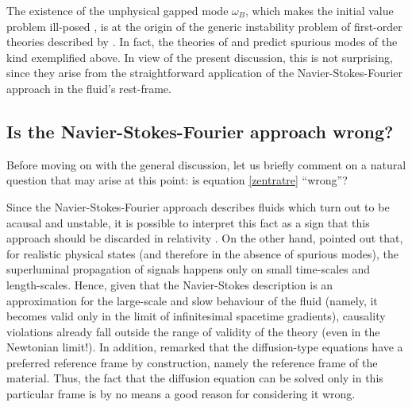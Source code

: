 \documentclass[a4paper, amsfonts, amssymb, amsmath, reprint, twocolumn, showkeys, nofootinbib]{revtex4-2}
\begin{document}
The existence of the unphysical gapped mode $\omega_B$, which makes the initial value problem ill-posed \citep{Kost2000}, is at the origin of the generic instability problem of first-order theories described by \citet{Hiscock_Insatibility_first_order}. In fact, the theories of \citet{Eckart40} and \citet{landau6} predict spurious modes of the kind exemplified above. In view of the present discussion, this is not surprising, since they arise from the straightforward application of the Navier-Stokes-Fourier approach in the fluid's rest-frame. 

\subsection{Is the Navier-Stokes-Fourier approach wrong?}

Before moving on with the general discussion, let us briefly comment on a natural question that may arise at this point: is equation \eqref{zentratre} ``wrong''? 

Since the Navier-Stokes-Fourier approach describes fluids which turn out to be acausal and unstable, it is possible to interpret this fact as a sign that this approach should be discarded in relativity \citep{Hiscock_Insatibility_first_order,rezzolla_book}. 
On the other hand, \citet{Kost2000} pointed out that, for realistic physical states (and therefore in the absence of spurious modes), the superluminal propagation of signals happens only on small time-scales and length-scales. 
Hence, given that the Navier-Stokes description is an approximation for the large-scale and slow behaviour of the fluid (namely, it becomes valid only in the limit of infinitesimal spacetime gradients), causality violations already fall outside the range of validity of the theory (even in the Newtonian limit!). In addition, \citet{Kost2000} remarked that the diffusion-type equations have a preferred reference frame by construction, namely the reference frame of the material. Thus, the fact that the diffusion equation can be solved only in this particular frame is by no means a good reason for considering it wrong.
\end{document}

